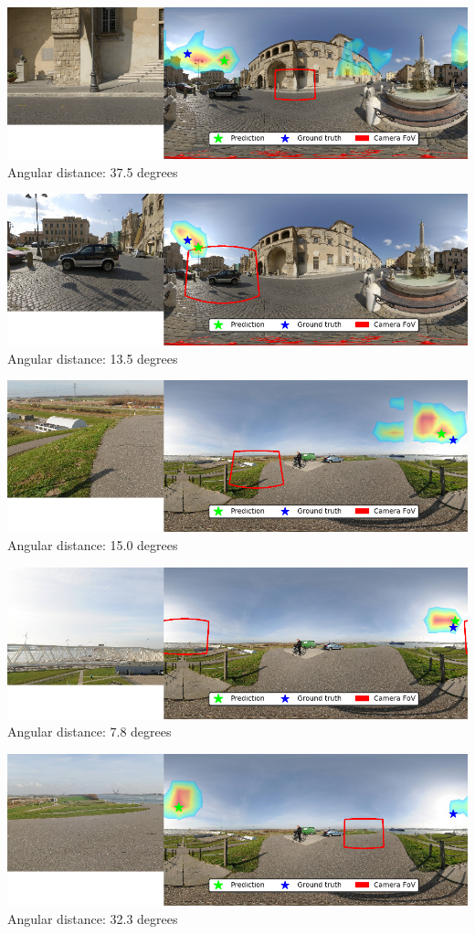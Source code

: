 \begin{multicols}{2}
\includegraphics[width=\mywidth]{pano_aakpbaojeqowkb_004.jpg}\\
Angular distance: 37.5 degrees

\includegraphics[width=\mywidth]{pano_aakpbaojeqowkb_003.jpg}\\
Angular distance: 13.5 degrees

\includegraphics[width=\mywidth]{pano_aaqezlelvvcrrh_005.jpg}\\
Angular distance: 15.0 degrees

\includegraphics[width=\mywidth]{pano_aaqezlelvvcrrh_002.jpg}\\
Angular distance: 7.8 degrees

\includegraphics[width=\mywidth]{pano_aaqezlelvvcrrh_006.jpg}\\
Angular distance: 32.3 degrees


\end{multicols}
